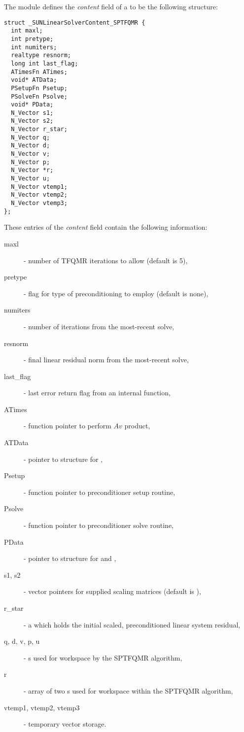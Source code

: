 The {\sunlinsolsptfqmr} module defines the {\em content} field of a
 to be the following structure:
\begin{verbatim}
struct _SUNLinearSolverContent_SPTFQMR {
  int maxl;
  int pretype;
  int numiters;
  realtype resnorm;
  long int last_flag;
  ATimesFn ATimes;
  void* ATData;
  PSetupFn Psetup;
  PSolveFn Psolve;
  void* PData;
  N_Vector s1;
  N_Vector s2;
  N_Vector r_star;
  N_Vector q;
  N_Vector d;
  N_Vector v;
  N_Vector p;
  N_Vector *r;
  N_Vector u;
  N_Vector vtemp1;
  N_Vector vtemp2;
  N_Vector vtemp3;
};
\end{verbatim}
These entries of the \emph{content} field contain the following
information:
\begin{description}
  \item[maxl] - number of TFQMR iterations to allow (default is 5),
  \item[pretype] - flag for type of preconditioning to employ
    (default is none),
  \item[numiters] - number of iterations from the most-recent solve,
  \item[resnorm] - final linear residual norm from the most-recent solve,
  \item[last\_flag] - last error return flag from an internal function,
  \item[ATimes] - function pointer to perform $Av$ product,
  \item[ATData] - pointer to structure for ,
  \item[Psetup] - function pointer to preconditioner setup routine,
  \item[Psolve] - function pointer to preconditioner solve routine,
  \item[PData] - pointer to structure for  and ,
  \item[s1, s2] - vector pointers for supplied scaling matrices
    (default is ),
  \item[r\_star] - a {\nvector} which holds the initial scaled,
    preconditioned linear system residual,
  \item[q, d, v, p, u] - {\nvector}s used for workspace by the SPTFQMR
    algorithm,
  \item [r] - array of two {\nvector}s used for workspace within the
    SPTFQMR algorithm,
  \item[vtemp1, vtemp2, vtemp3] - temporary vector storage.
\end{description}

